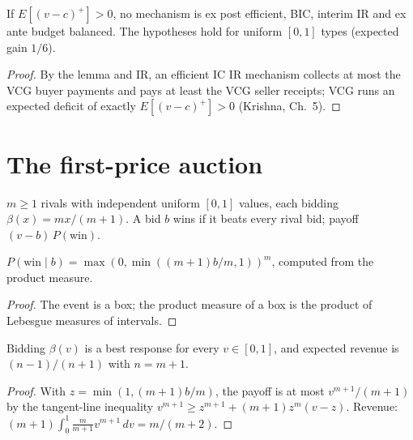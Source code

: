 \begin{theorem}
\label{thm:ms}
\leanok
{}
If $E[(v - c)^+] > 0$, no mechanism is ex post efficient, BIC, interim IR and ex ante budget balanced. The
hypotheses hold for uniform $[0,1]$ types (expected gain $1/6$).
\end{theorem}
\begin{proof}
\leanok
By the lemma and IR, an efficient IC IR mechanism collects at most the VCG buyer payments and pays at least the
VCG seller receipts; VCG runs an expected deficit of exactly $E[(v-c)^+] > 0$ (Krishna, Ch.~5).
\end{proof}

\section{The first-price auction}

\begin{definition}
\label{def:fpa}
\leanok
$m \ge 1$ rivals with independent uniform $[0,1]$ values, each bidding $\beta(x) = m x/(m+1)$. A bid $b$ wins if it
beats every rival bid; payoff $(v - b)\,P(\text{win})$.
\end{definition}

\begin{lemma}
\label{lem:fpa-win}
\leanok
{}
$P(\text{win} \mid b) = \max(0, \min((m+1)b/m, 1))^m$, computed from the product measure.
\end{lemma}
\begin{proof}
\leanok
The event is a box; the product measure of a box is the product of Lebesgue measures of intervals.
\end{proof}

\begin{theorem}
\label{thm:fpa}
\leanok
{}
Bidding $\beta(v)$ is a best response for every $v \in [0,1]$, and expected revenue is $(n-1)/(n+1)$ with $n = m+1$.
\end{theorem}
\begin{proof}
\leanok
With $z = \min(1, (m+1)b/m)$, the payoff is at most $v^{m+1}/(m+1)$ by the tangent-line inequality
$v^{m+1} \ge z^{m+1} + (m+1) z^m (v - z)$. Revenue: $(m+1)\int_0^1 \tfrac{m}{m+1} v^{m+1}\,dv = m/(m+2)$.
\end{proof}

